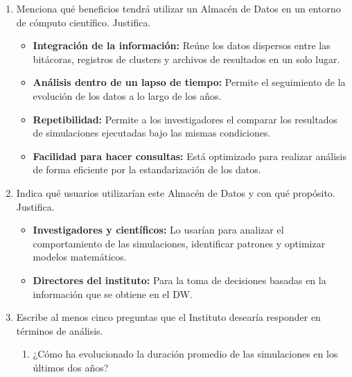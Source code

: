 \begin{enumerate}

        \item Menciona qué beneficios tendrá utilizar un Almacén de Datos en un entorno de cómputo científico. Justifica.

            \begin{itemize}
                \item \textbf{Integración de la información: } Reúne los datos dispersos entre las bitácoras, registros de clusters y archivos de resultados en un solo lugar.

                \item \textbf{Análisis dentro de un lapso de tiempo: } Permite el seguimiento de la evolución de los datos a lo largo de los años.

                \item \textbf{Repetibilidad: } Permite a los investigadores el comparar los resultados de simulaciones ejecutadas bajo las mismas condiciones.

                \item \textbf{Facilidad para hacer consultas: } Está optimizado para realizar análisis de forma eficiente por la estandarización de los datos.
            \end{itemize}

        \item Indica qué usuarios utilizarían este Almacén de Datos y con qué propósito. Justifica.

            \begin{itemize}
                \item \textbf{Investigadores y científicos: } Lo usarían para analizar el comportamiento de las simulaciones, identificar patrones y optimizar modelos matemáticos.

                \item \textbf{Directores del instituto: } Para la toma de decisiones basadas en la información que se obtiene en el DW.
            \end{itemize}

        \item Escribe al menos cinco preguntas que el Instituto desearía responder en términos de análisis.

            \begin{enumerate}
                \item ¿Cómo ha evolucionado la duración promedio de las simulaciones en los últimos dos años?


\end{enumerate}
\end{enumerate}
